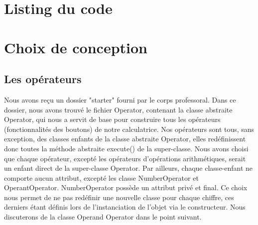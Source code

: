 \documentclass[12pt]{report}
\begin{document}
    \section*{Listing du code}

    \section*{Choix de conception}
        \subsection*{Les opérateurs}
            Nous avons reçu un dossier "starter" fourni par le corps professoral. Dans ce dossier, nous avons trouvé le
    fichier Operator, contenant la classe abstraite Operator, qui nous a servit de base pour construire tous les opérateurs (fonctionnalités des boutons) de notre
    calculatrice.
    \newline Nos opérateurs sont tous, sans exception, des classes enfants de la classe abstraite Operator, elles redéfinissent
    donc toutes la méthode abstraite execute() de la super-classe.
    Nous avons choisi que chaque opérateur, excepté les opérateurs d'opérations arithmétiques, serait un enfant direct de la
    super-classe Operator.
    \newline
    Par ailleurs, chaque classe-enfant ne comporte aucun attribut, excepté les classe NumberOperator et OperantOperator.
    NumberOperator possède un attribut privé et final. Ce choix nous permet de ne pas redéfinir une nouvelle classe pour chaque
    chiffre, ces derniers étant définis lors de l'instanciation de l'objet via le constructeur.
    \newline Nous discuterons de la classe Operand Operator dans le point suivant.
\end{document}
